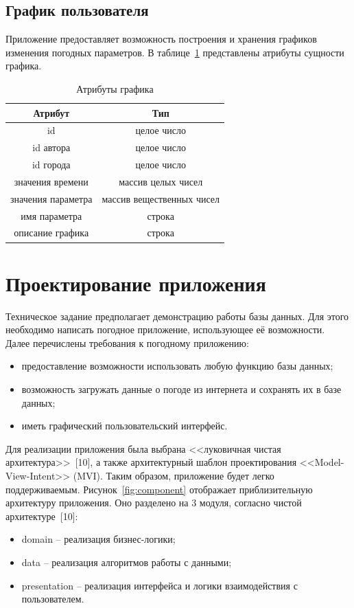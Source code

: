 \subsection*{График пользователя}
Приложение предоставляет возможность построения и хранения графиков изменения погодных параметров.
В таблице~\ref{table:plot_attr} представлены атрибуты сущности графика.

\begin{table}[H]
    \centering
    \begin{tabular}{ |c|c| }
        \hline
            \textbf{Атрибут} & \textbf{Тип} \\
        \hline
            id & целое число \\
        \hline
            id автора & целое число \\
        \hline
            id города & целое число \\
        \hline
            значения времени & массив целых чисел \\
        \hline
            значения параметра & массив вещественных чисел \\
        \hline
            имя параметра & строка \\
        \hline
            описание графика & строка \\
        \hline
            
    \end{tabular}
    \caption{\centering Атрибуты графика}
    \label{table:plot_attr}
\end{table}

\section{Проектирование приложения}
Техническое задание предполагает демонстрацию работы базы данных.
Для этого необходимо написать погодное приложение, использующее её возможности.
Далее перечислены требования к погодному приложению:
\begin{itemize}
    \item
        предоставление возможности использовать любую функцию базы данных;
    \item
        возможность загружать данные о погоде из интернета и сохранять их в базе данных;
    \item иметь графический пользовательский интерфейс.
\end{itemize}

Для реализации приложения была выбрана <<луковичная чистая архитектура>>~[10], а также архитектурный шаблон проектирования <<Model-View-Intent>> (MVI).
Таким образом, приложение будет легко поддерживаемым.
Рисунок~\ref{fig:component} отображает приблизительную архитектуру приложения.
Оно разделено на 3 модуля, согласно чистой архитектуре~[10]:
\begin{itemize}
    \item domain -- реализация бизнес-логики;
    \item data -- реализация алгоритмов работы с данными;
    \item presentation -- реализация интерфейса и логики взаимодействия с пользователем.
\end{itemize}

